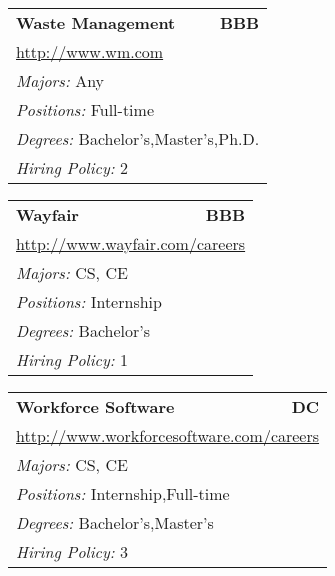 \documentclass[twoside]{article}
\begin{document}
\begin{center}
\begin{multicols}{3}
\begin{FlushLeft}
\begin{minipage}{\columnwidth}
\end{minipage}
 
\begin{minipage}{\columnwidth}\begin{tabularx}{.95\columnwidth}{Xr}
                 {\Large\bf Waste Management} & {\Large\bf BBB}\\
    \multicolumn{2}{p{.95\columnwidth}}{\url{http://www.wm.com}}\\
    \multicolumn{2}{p{.95\columnwidth}}{\emph{Majors:} Any}\\
    \multicolumn{2}{p{.95\columnwidth}}{\emph{Positions:} Full-time}\\
    \multicolumn{2}{p{.95\columnwidth}}{\emph{Degrees:} Bachelor's,Master's,Ph.D.}\\
    \multicolumn{2}{p{.95\columnwidth}}{\emph{Hiring Policy:} 2}\\
    \end{tabularx}
    
\end{minipage}
 
\begin{minipage}{\columnwidth}\begin{tabularx}{.95\columnwidth}{Xr}
                 {\Large\bf Wayfair} & {\Large\bf BBB}\\
    \multicolumn{2}{p{.95\columnwidth}}{\url{http://www.wayfair.com/careers}}\\
    \multicolumn{2}{p{.95\columnwidth}}{\emph{Majors:} CS, CE}\\
    \multicolumn{2}{p{.95\columnwidth}}{\emph{Positions:} Internship}\\
    \multicolumn{2}{p{.95\columnwidth}}{\emph{Degrees:} Bachelor's}\\
    \multicolumn{2}{p{.95\columnwidth}}{\emph{Hiring Policy:} 1}\\
    \end{tabularx}
    
\end{minipage}
 
\begin{minipage}{\columnwidth}\begin{tabularx}{.95\columnwidth}{Xr}
                 {\Large\bf Workforce Software} & {\Large\bf DC}\\
    \multicolumn{2}{p{.95\columnwidth}}{\url{http://www.workforcesoftware.com/careers}}\\
    \multicolumn{2}{p{.95\columnwidth}}{\emph{Majors:} CS, CE}\\
    \multicolumn{2}{p{.95\columnwidth}}{\emph{Positions:} Internship,Full-time}\\
    \multicolumn{2}{p{.95\columnwidth}}{\emph{Degrees:} Bachelor's,Master's}\\
    \multicolumn{2}{p{.95\columnwidth}}{\emph{Hiring Policy:} 3}\\
    \end{tabularx}
    

\end{minipage}
\end{FlushLeft}
\end{multicols}
\end{center}
\end{document}
